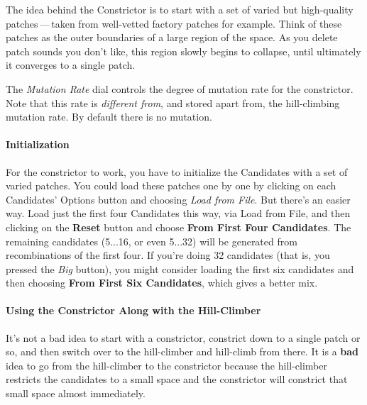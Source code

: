 \documentclass{article}
\begin{document}
The idea behind the Constrictor is to start with a set of varied but high-quality patches\,---\,taken from well-vetted factory patches for example.  Think of these patches as the outer boundaries of a large region of the space.  As you delete patch sounds you don't like, this region slowly begins to collapse, until ultimately it converges to a single patch.

The {\it Mutation Rate} dial controls the degree of mutation rate for the constrictor.  Note that this rate is {\it different from}, and stored apart from, the hill-climbing mutation rate.  By default there is no mutation. 

\paragraph{Initialization}  For the constrictor to work, you have to initialize the Candidates with a set of varied patches.  You could load these patches one by one by clicking on each Candidates' Options button and choosing {\it Load from File}.  But there's an easier way.  Load just the first four Candidates this way, via Load from File, and then clicking on the {\bf Reset} button and choose {\bf From First Four Candidates}.  The remaining candidates (5...16, or even 5...32) will be generated from recombinations of the first four.  If you're doing 32 candidates (that is, you pressed the {\it Big} button), you might consider loading the first six candidates and then choosing {\bf From First Six Candidates}, which gives a better mix.


\paragraph{Using the Constrictor Along with the Hill-Climber} It's not a bad idea to start with a constrictor, constrict down to a single patch or so, and then switch over to the hill-climber and hill-climb from there.  It is a {\bf bad} idea to go from the hill-climber to the constrictor because the hill-climber restricts the candidates to a small space and the constrictor will constrict that small space almost immediately.
\end{document}
